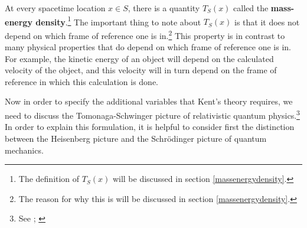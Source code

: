 At every spacetime location $x\in S$, there is a quantity $T_S(x)$ called the \label{massenergydensity}\textbf{mass-energy density}.\footnote{The definition of $T_S(x)$ will be discussed in section \ref{massenergydensity}.} The important thing to note about $T_S(x)$ is that it does not depend on which frame of reference one is in.\footnote{The reason for why this is will be discussed in section \ref{massenergydensity}.}
  This property is in contrast to many physical properties that do depend on which frame of reference one is in. For example, the kinetic energy of an object will depend on the calculated velocity of the object, and this velocity will in turn depend on the frame of reference in which this calculation is done. 
  
Now in order to specify the additional variables that Kent's theory requires, we need to discuss the Tomonaga-Schwinger picture of relativistic quantum physics.\footnote{See \cite{SchwingerJulianI}; \cite{TomonagaI}} In order to explain this formulation, it is helpful to consider first the distinction between the Heisenberg picture and the Schr\"{o}dinger picture of quantum mechanics. 

